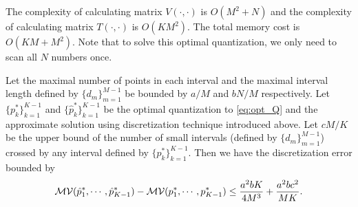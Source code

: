 The complexity of calculating matrix $V(\cdot, \cdot)$ is $O(M^2 + N)$ and the complexity of calculating matrix $T(\cdot, \cdot)$ is $O(KM^2)$. The total memory cost is $O(KM + M^2)$. Note that to solve this optimal quantization, we only need to scan all $N$ numbers once.

\begin{theorem}
Let the maximal number of points in each interval and the maximal interval length defined by $\{d_m\}_{m=1}^{M-1}$ be bounded by $a/M$ and $bN/M$ respectively. Let $\{p^*_k\}_{k=1}^{K-1}$ and $\{\hat{p}^*_k\}_{k=1}^{K-1}$ be the optimal quantization to \eqref{eq:opt_Q} and the approximate solution using discretization technique introduced above. Let $cM/K$ be the upper bound of the number of small intervals (defined by $\{d_m\}_{m=1}^{M-1}$) crossed by any interval defined by $\{p^*_k\}_{k=1}^{K-1}$. Then we have the discretization error bounded by
\[
 \mathcal{MV}(\hat{p}^*_1,\cdots, \hat{p}^*_{K-1}) -  \mathcal{MV}(p^*_1,\cdots, p^*_{K-1}) \leq {a^2b K \over 4 M^3} + {a^2bc^2 \over MK}.
\]
\end{theorem}


